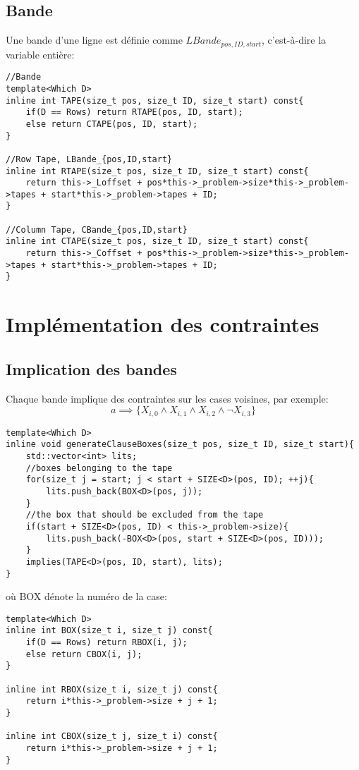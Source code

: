 \documentclass[a4paper,12pt]{report}
\begin{document}
\subsection{Bande}
Une bande d'une ligne est définie comme $LBande_{pos,ID,start}$, c'est-à-dire la variable entière:
\lstset{style=Cpp, caption=Une bande comme variable, label=C:bande}
\begin{lstlisting}[mathescape=true]
//Bande
template<Which D>
inline int TAPE(size_t pos, size_t ID, size_t start) const{
	if(D == Rows) return RTAPE(pos, ID, start);
	else return CTAPE(pos, ID, start);
}

//Row Tape, LBande_{pos,ID,start}
inline int RTAPE(size_t pos, size_t ID, size_t start) const{
	return this->_Loffset + pos*this->_problem->size*this->_problem->tapes + start*this->_problem->tapes + ID;
}

//Column Tape, CBande_{pos,ID,start}
inline int CTAPE(size_t pos, size_t ID, size_t start) const{
	return this->_Coffset + pos*this->_problem->size*this->_problem->tapes + start*this->_problem->tapes + ID;
}
\end{lstlisting}

\section{Implémentation des contraintes}
\subsection{Implication des bandes}
Chaque bande implique des contraintes sur les cases voisines, par exemple:
$$a \implies \{X_{i,0} \wedge X_{i,1} \wedge X_{i,2} \wedge \lnot X_{i,3}\}$$
\lstset{style=Cpp, caption=Une bande en FNC, label=C:Boxes}
\begin{lstlisting}[mathescape=true]
template<Which D>
inline void generateClauseBoxes(size_t pos, size_t ID, size_t start){
	std::vector<int> lits;
	//boxes belonging to the tape
	for(size_t j = start; j < start + SIZE<D>(pos, ID); ++j){
		lits.push_back(BOX<D>(pos, j));
	}
	//the box that should be excluded from the tape
	if(start + SIZE<D>(pos, ID) < this->_problem->size){
		lits.push_back(-BOX<D>(pos, start + SIZE<D>(pos, ID)));
	}
	implies(TAPE<D>(pos, ID, start), lits);
}
\end{lstlisting}
où BOX dénote la numéro de la case:
\lstset{style=Cpp, caption=Case, label=C:BOX}
\begin{lstlisting}[mathescape=true]
template<Which D>
inline int BOX(size_t i, size_t j) const{
	if(D == Rows) return RBOX(i, j);
	else return CBOX(i, j);
}

inline int RBOX(size_t i, size_t j) const{
	return i*this->_problem->size + j + 1;
}

inline int CBOX(size_t j, size_t i) const{
	return i*this->_problem->size + j + 1;
}
\end{lstlisting}
\end{document}

